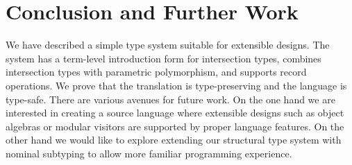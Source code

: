 \section{Conclusion and Further Work}

We have described a simple type system suitable for extensible designs.
 The system has a term-level
introduction form for intersection types, combines intersection types with
parametric polymorphism, and supports record operations. We prove that the
translation is type-preserving and the language is type-safe. There are various
avenues for future work. On the one hand we are interested in creating a source
language where extensible designs such as object algebras or modular visitors
are supported by proper language features. On the other hand we would like to
explore extending our structural type system with nominal subtyping to allow
more familiar programming experience.
